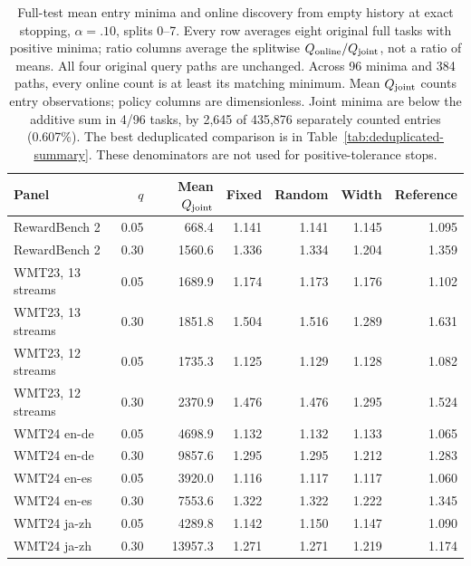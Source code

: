\begin{table}[t]
\centering\small
\begin{tabular}{lrrrrrr}
\toprule
Panel & $q$ & Mean $Q_{\rm joint}$ & Fixed & Random & Width & Reference \\
\midrule
RewardBench 2 & 0.05 & 668.4 & 1.141 & 1.141 & 1.145 & 1.095 \\
RewardBench 2 & 0.30 & 1560.6 & 1.336 & 1.334 & 1.204 & 1.359 \\
WMT23, 13 streams & 0.05 & 1689.9 & 1.174 & 1.173 & 1.176 & 1.102 \\
WMT23, 13 streams & 0.30 & 1851.8 & 1.504 & 1.516 & 1.289 & 1.631 \\
WMT23, 12 streams & 0.05 & 1735.3 & 1.125 & 1.129 & 1.128 & 1.082 \\
WMT23, 12 streams & 0.30 & 2370.9 & 1.476 & 1.476 & 1.295 & 1.524 \\
WMT24 en-de & 0.05 & 4698.9 & 1.132 & 1.132 & 1.133 & 1.065 \\
WMT24 en-de & 0.30 & 9857.6 & 1.295 & 1.295 & 1.212 & 1.283 \\
WMT24 en-es & 0.05 & 3920.0 & 1.116 & 1.117 & 1.117 & 1.060 \\
WMT24 en-es & 0.30 & 7553.6 & 1.322 & 1.322 & 1.222 & 1.345 \\
WMT24 ja-zh & 0.05 & 4289.8 & 1.142 & 1.150 & 1.147 & 1.090 \\
WMT24 ja-zh & 0.30 & 13957.3 & 1.271 & 1.271 & 1.219 & 1.174 \\
\bottomrule
\end{tabular}
\caption{Full-test mean entry minima and online discovery from empty history at exact stopping, $\alpha=.10$, splits 0--7. Every row averages eight original full tasks with positive minima; ratio columns average the splitwise $Q_{\rm online}/Q_{\rm joint}$, not a ratio of means. All four original query paths are unchanged. Across 96 minima and 384 paths, every online count is at least its matching minimum. Mean $Q_{\rm joint}$ counts entry observations; policy columns are dimensionless. Joint minima are below the additive sum in 4/96 tasks, by 2,645 of 435,876 separately counted entries (0.607\%). The best deduplicated comparison is in Table~\ref{tab:deduplicated-summary}. These denominators are not used for positive-tolerance stops.}
\label{tab:joint-full-discovery}
\end{table}
